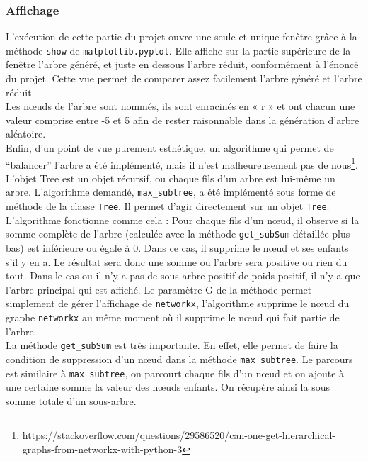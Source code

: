 \documentclass[a4papper]{article}
\begin{document}
		\subsubsection{Affichage}
			L’exécution de cette partie du projet ouvre une seule et unique fenêtre grâce à la méthode \texttt{show} de \texttt{matplotlib.pyplot}. Elle affiche sur la partie supérieure de la fenêtre l’arbre généré, et juste en dessous l’arbre réduit, conformément à l’énoncé du projet. Cette vue permet de comparer assez facilement l’arbre généré et l’arbre réduit.\\
			
Les nœuds de l’arbre sont nommés, ils sont enracinés en « r » et ont chacun une valeur comprise entre -5 et 5 afin de rester raisonnable dans la génération d’arbre aléatoire.\\

Enfin, d’un point de vue purement esthétique, un algorithme qui permet de “balancer” l’arbre a été implémenté, mais il n’est malheureusement pas de nous\footnote{https://stackoverflow.com/questions/29586520/can-one-get-hierarchical-graphs-from-networkx-with-python-3}.\\

			L’objet Tree est un objet récursif, ou chaque fils d’un arbre est lui-même un arbre. 
L’algorithme demandé, \texttt{max\_subtree}, a été implémenté sous forme de méthode de la classe \texttt{Tree}.
Il permet d’agir directement sur un objet \texttt{Tree}.\\
 
L’algorithme fonctionne comme cela : Pour chaque fils d’un nœud, il observe si la somme complète de l’arbre (calculée avec la méthode \texttt{get\_subSum} détaillée plus bas) est inférieure ou égale à 0. Dans ce cas, il supprime le nœud et ses enfants s’il y en a. Le résultat sera donc une somme ou l’arbre sera positive ou rien du tout. Dans le cas ou il n’y a pas de sous-arbre positif de poids positif, il n’y a que l’arbre principal qui est affiché.
Le paramètre G de la méthode permet simplement de gérer l’affichage de \texttt{networkx}, l’algorithme supprime le nœud du graphe \texttt{networkx} au même moment où il supprime le nœud qui fait partie de l’arbre.\\

La méthode \texttt{get\_subSum} est très importante. En effet, elle permet de faire la condition de suppression d’un nœud dans la méthode \texttt{max\_subtree}.
Le parcours est similaire à \texttt{max\_subtree}, on parcourt chaque fils d’un nœud et on ajoute à une certaine somme la valeur des nœuds enfants. On récupère ainsi la sous somme totale d’un sous-arbre.
\end{document}
